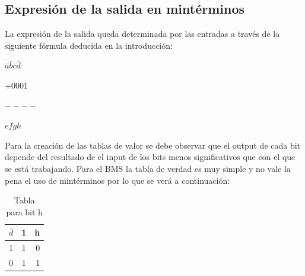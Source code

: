 \subsection{Expresión de la salida en mintérminos}
\hspace{10mm} La expresión de la salida queda determinada por las entradas a través de la siguiente fórmula deducida en la introducción:\\
\centerline{$\overline{a} \overline{b} \overline{c} \overline{d}$}
\centerline{$+0001$}
\centerline{$----$}
\centerline{$efgh$}	
\hspace{10mm} Para la creación de las tablas de valor se debe observar que el output de cada bit depende del resultado de el input de los bits menos significativos que con el que se está trabajando.
Para el BMS la tabla de verdad es muy simple y no vale la pena el uso de mintérminos por lo que se verá a continuación:
\begin{table}[h!]
	\begin{center}
		\caption{Tabla para bit h}
		\vspace{5mm}
		\begin{tabular}{l|c|r}
			\textbf{$\overline{d}$} & \textbf{1} & \textbf{h} \\
			\hline
			1                       & 1          & 0          \\
			0                       & 1          & 1          \\			
		\end{tabular}
	\end{center}
\end{table}

